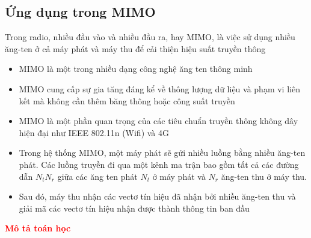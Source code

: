 \subsection{Ứng dụng trong MIMO}
Trong radio, nhiều đầu vào và nhiều đầu ra, hay MIMO, là việc sử dụng nhiều ăng-ten
ở cả máy phát và máy thu để cải thiện hiệu suất truyền thông\\
\begin{itemize}
	\item MIMO là một trong nhiều dạng công nghệ ăng ten thông minh
	\item MIMO cung cấp sự gia tăng đáng kể về thông lượng dữ liệu và phạm vi liên kết
	mà không cần thêm băng thông hoặc công suất truyền
	\item MIMO là một phần quan trọng của các tiêu chuẩn truyền thông không dây hiện
	đại như IEEE 802.11n (Wifi) và 4G
	\item Trong hệ thống MIMO, một máy phát sẽ gửi nhiều luồng bằng nhiều ăng-ten
	phát. Các luồng truyền đi qua một kênh ma trận bao gồm tất cả các đường dẫn 
	$N_tN_r$ giữa các ăng ten phát $N_t$ ở máy phát và $N_r$ ăng-ten thu ở máy thu.
	
	\item Sau đó, máy thu nhận các vectơ tín hiệu đã nhận bởi nhiều ăng-ten thu và giải
	mã các vectơ tín hiệu nhận được thành thông tin ban đầu
	
\end{itemize}
\textbf{\textcolor{red}{Mô tả toán học}}\\


